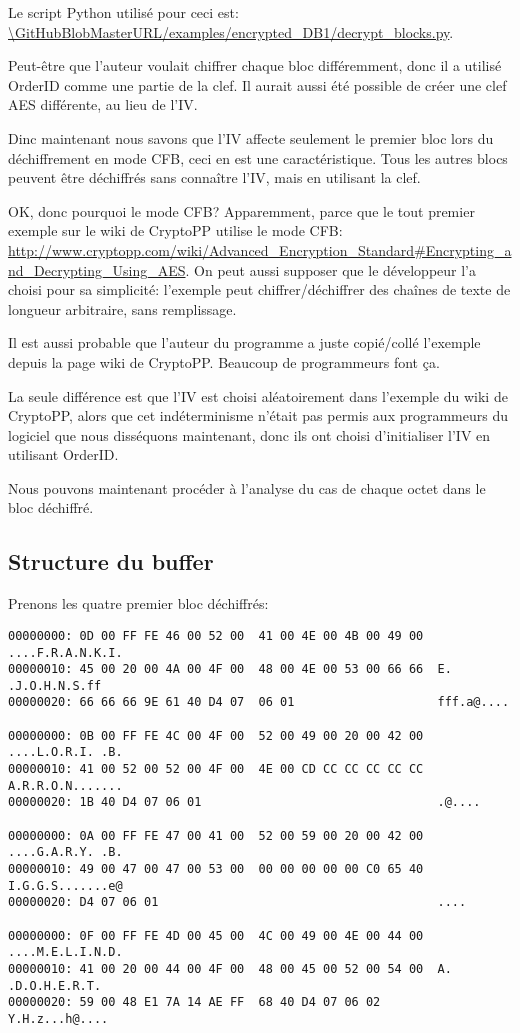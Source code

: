 Le script Python utilisé pour ceci est:
\url{\GitHubBlobMasterURL/examples/encrypted_DB1/decrypt_blocks.py}.

Peut-être que l'auteur voulait chiffrer chaque bloc différemment, donc il a utilisé
OrderID comme une partie de la clef.
Il aurait aussi été possible de créer une clef AES différente, au lieu de l'\ac{IV}.

Dinc maintenant nous savons que l'\ac{IV} affecte seulement le premier bloc lors
du déchiffrement en mode \ac{CFB}, ceci en est une caractéristique.
Tous les autres blocs peuvent être déchiffrés sans connaître l'\ac{IV}, mais en utilisant
la clef.

OK, donc pourquoi le mode \ac{CFB}? Apparemment, parce que le tout premier exemple
sur le wiki de CryptoPP utilise le mode \ac{CFB}:
\url{http://www.cryptopp.com/wiki/Advanced_Encryption_Standard#Encrypting_and_Decrypting_Using_AES}.
On peut aussi supposer que le développeur l'a choisi pour sa simplicité:
l'exemple peut chiffrer/déchiffrer des chaînes de texte de longueur arbitraire, sans
remplissage.

Il est aussi probable que l'auteur du programme a juste copié/collé l'exemple depuis
la page wiki de CryptoPP.
Beaucoup de programmeurs font ça.

La seule différence est que l'\ac{IV} est choisi aléatoirement dans l'exemple du
wiki de CryptoPP, alors que cet indéterminisme n'était pas permis aux programmeurs
du logiciel que nous disséquons maintenant, donc ils ont choisi d'initialiser l'\ac{IV}
en utilisant OrderID.

Nous pouvons maintenant procéder à l'analyse du cas de chaque octet dans le bloc
déchiffré.

\subsection{Structure du buffer}

Prenons les quatre premier bloc déchiffrés:

\begin{lstlisting}
00000000: 0D 00 FF FE 46 00 52 00  41 00 4E 00 4B 00 49 00  ....F.R.A.N.K.I.
00000010: 45 00 20 00 4A 00 4F 00  48 00 4E 00 53 00 66 66  E. .J.O.H.N.S.ff
00000020: 66 66 66 9E 61 40 D4 07  06 01                    fff.a@....

00000000: 0B 00 FF FE 4C 00 4F 00  52 00 49 00 20 00 42 00  ....L.O.R.I. .B.
00000010: 41 00 52 00 52 00 4F 00  4E 00 CD CC CC CC CC CC  A.R.R.O.N.......
00000020: 1B 40 D4 07 06 01                                 .@....

00000000: 0A 00 FF FE 47 00 41 00  52 00 59 00 20 00 42 00  ....G.A.R.Y. .B.
00000010: 49 00 47 00 47 00 53 00  00 00 00 00 00 C0 65 40  I.G.G.S.......e@
00000020: D4 07 06 01                                       ....

00000000: 0F 00 FF FE 4D 00 45 00  4C 00 49 00 4E 00 44 00  ....M.E.L.I.N.D.
00000010: 41 00 20 00 44 00 4F 00  48 00 45 00 52 00 54 00  A. .D.O.H.E.R.T.
00000020: 59 00 48 E1 7A 14 AE FF  68 40 D4 07 06 02        Y.H.z...h@....
\end{lstlisting}

